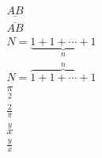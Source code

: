 \documentclass{article}
\begin{document}
\begin{gather}
  \underline{AB} \\
  \overline{AB} \\
  N = \underbrace{1 + 1 + \cdots + 1}_n \\
  N = \overbrace{1 + 1 + \cdots + 1}^n \\
  \underset{2}{\pi} \\
  \frac{2}{\pi} \\
  \overset{y}{x} \\
  \frac{y}{x}
\end{gather}
\end{document}

